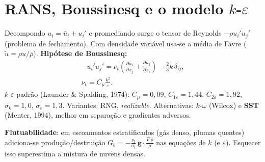 \documentclass[10pt,a4paper,twocolumn,openany]{report}
\newenvironment{conceito}[1]{\section{#1}}{\par}
\begin{document}
\begin{conceito}{RANS, Boussinesq e o modelo $k$-$\varepsilon$}
Decompondo $u_i=\bar u_i+u_i'$ e promediando surge o tensor de Reynolds
$-\rho\overline{u_i'u_j'}$ (problema de fechamento). Com densidade variável
usa-se a média de Favre ($\tilde u = \overline{\rho u}/\bar\rho$).
\textbf{Hipótese de Boussinesq:}
\begin{gather*}
  -\overline{u_i'u_j'} = \nu_t\left(\frac{\partial\bar u_i}{\partial x_j}
  +\frac{\partial\bar u_j}{\partial x_i}\right)-\frac23 k\,\delta_{ij},\\
  \nu_t = C_\mu\frac{k^2}{\varepsilon}.
\end{gather*}
$k$-$\varepsilon$ padrão (Launder \& Spalding, 1974): $C_\mu=0{,}09$,
$C_{1\varepsilon}=1{,}44$, $C_{2\varepsilon}=1{,}92$, $\sigma_k=1{,}0$,
$\sigma_\varepsilon=1{,}3$. Variantes: RNG, \emph{realizable}. Alternativas:
$k$-$\omega$ (Wilcox) e \textbf{SST} (Menter, 1994), melhor em separação e
gradientes adversos.

\textbf{Flutuabilidade}: em escoamentos estratificados (gás denso, plumas
quentes) adiciona-se produção/destruição $G_b = -\frac{\nu_t}{\sigma_t}\,
\mathbf{g}\cdot\frac{\nabla\bar\rho}{\bar\rho}$ nas equações de $k$ (e
$\varepsilon$). Esquecer isso superestima a mistura de nuvens densas.
\end{conceito}
\end{document}
